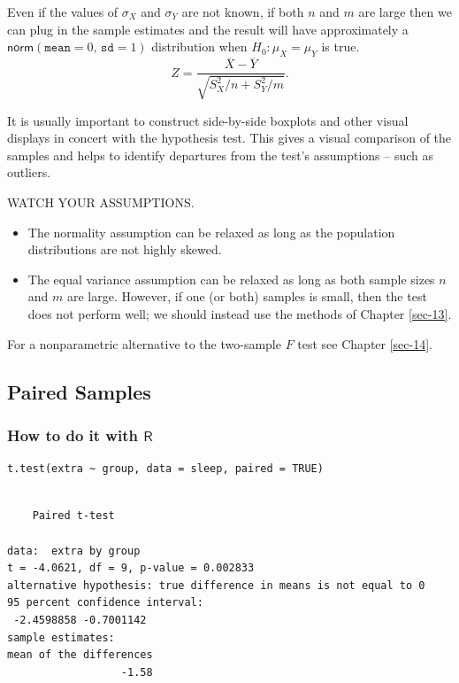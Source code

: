 \documentclass[captions=tableheading]{scrbook}
\begin{document}
\begin{rem}
Even if the values of \(\sigma_{X}\) and \(\sigma_{Y}\) are not known, if both \(n\) and \(m\) are large then we can plug in the sample estimates and the result will have approximately a \(\mathsf{norm}(\mathtt{mean}=0,\,\mathtt{sd}=1)\) distribution when \(H_{0}:\mu_{X}=\mu_{Y}\) is true.
\begin{equation} 
Z=\frac{\overline{X}-\overline{Y}}{\sqrt{S_{X}^{2}/n+S_{Y}^{2}/m}}.
\end{equation}
\end{rem}

\begin{rem}
It is usually important to construct side-by-side boxplots and other visual displays in concert with the hypothesis test. This gives a visual comparison of the samples and helps to identify departures from the test's assumptions -- such as outliers.
\end{rem}

\begin{rem}
WATCH YOUR ASSUMPTIONS.
\begin{itemize}
\item The normality assumption can be relaxed as long as the population distributions are not highly skewed.
\item The equal variance assumption can be relaxed as long as both sample sizes \(n\) and \(m\) are large. However, if one (or both) samples is small, then the test does not perform well; we should instead use the methods of Chapter \ref{sec-13}.
\end{itemize}

\end{rem}

For a nonparametric alternative to the two-sample \(F\) test see Chapter \ref{sec-14}.
\subsection{Paired Samples}
\label{sec-10-4-2}
\subsubsection{How to do it with \(\mathsf{R}\)}
\label{sec-10-4-2-1}



\lstset{language=R}
\begin{lstlisting}
t.test(extra ~ group, data = sleep, paired = TRUE)
\end{lstlisting}


\begin{verbatim}

	Paired t-test

data:  extra by group 
t = -4.0621, df = 9, p-value = 0.002833
alternative hypothesis: true difference in means is not equal to 0 
95 percent confidence interval:
 -2.4598858 -0.7001142 
sample estimates:
mean of the differences 
                  -1.58
\end{verbatim}
\end{document}
